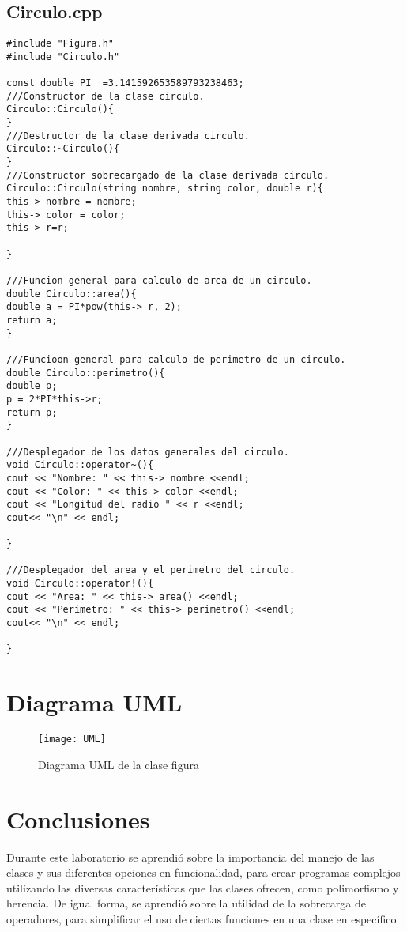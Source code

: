 \documentclass[11pt]{article}
\begin{document}
\subsection{Circulo.cpp}
\begin{lstlisting}
#include "Figura.h"
#include "Circulo.h"

const double PI  =3.141592653589793238463;
///Constructor de la clase circulo.
Circulo::Circulo(){
}
///Destructor de la clase derivada circulo.
Circulo::~Circulo(){
}
///Constructor sobrecargado de la clase derivada circulo.
Circulo::Circulo(string nombre, string color, double r){
this-> nombre = nombre;
this-> color = color;
this-> r=r;

}

///Funcion general para calculo de area de un circulo.
double Circulo::area(){
double a = PI*pow(this-> r, 2);
return a;
}

///Funcioon general para calculo de perimetro de un circulo.
double Circulo::perimetro(){
double p;
p = 2*PI*this->r;
return p;
}

///Desplegador de los datos generales del circulo.
void Circulo::operator~(){
cout << "Nombre: " << this-> nombre <<endl;
cout << "Color: " << this-> color <<endl;
cout << "Longitud del radio " << r <<endl;
cout<< "\n" << endl;

}

///Desplegador del area y el perimetro del circulo.
void Circulo::operator!(){
cout << "Area: " << this-> area() <<endl;
cout << "Perimetro: " << this-> perimetro() <<endl;
cout<< "\n" << endl;

}

\end{lstlisting}

\section{Diagrama UML}
\begin{figure}[!ht]
	\caption{Diagrama UML de la clase figura}
	\centering
	\texttt{[image: UML]}
\end{figure}


\section{Conclusiones}
Durante este laboratorio se aprendió sobre la importancia del manejo de las clases y sus diferentes opciones en funcionalidad, para crear programas complejos utilizando las diversas características que las clases ofrecen, como polimorfismo y herencia. De igual forma, se aprendió sobre la utilidad de la sobrecarga de operadores, para simplificar el uso de ciertas funciones en una clase en específico.
\end{document}
